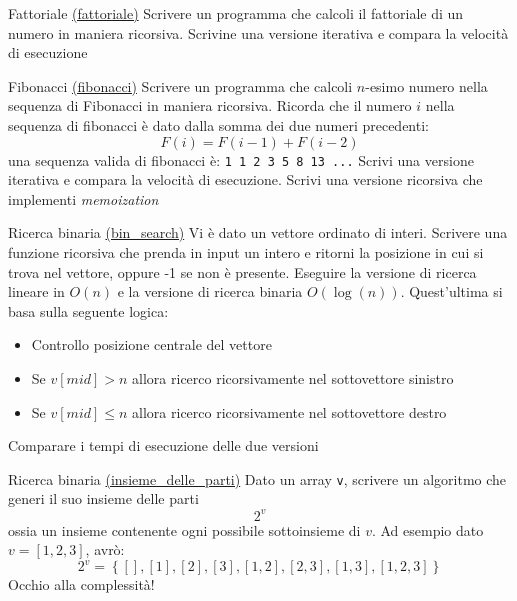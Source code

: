 \begin{esercizio}{Fattoriale \href{run:./files/algoritmi/fattoriale/}{(fattoriale)}}
	Scrivere un programma che calcoli il fattoriale di un numero in maniera ricorsiva. Scrivine una versione iterativa e compara la velocità di esecuzione
\end{esercizio}

\begin{esercizio}{Fibonacci \href{run:./files/algoritmi/fibonacci/}{(fibonacci)}}
	Scrivere un programma che calcoli $ n $-esimo numero nella sequenza di Fibonacci in maniera ricorsiva. Ricorda che il numero $ i $ nella sequenza di fibonacci è dato dalla somma dei due numeri precedenti:
	\[
		F(i) = F(i-1) + F(i-2)
	\]
	una sequenza valida di fibonacci è: \verb|1 1 2 3 5 8 13 ...|
	\vskip3mm
	Scrivi una versione iterativa e compara la velocità di esecuzione. Scrivi una versione ricorsiva che implementi \textit{memoization}
\end{esercizio}

\begin{esercizio}{Ricerca binaria \href{run:./files/algoritmi/bin_search/}{(bin\_search)}}
	Vi è dato un vettore ordinato di interi. Scrivere una funzione ricorsiva che prenda in input un intero e ritorni la posizione in cui si trova nel vettore, oppure -1 se non è presente.
	Eseguire la versione di ricerca lineare in $ O\left(n\right) $ e la versione di ricerca binaria $ O\left(\log \left(n\right)\right) $. Quest'ultima si basa sulla seguente logica:
	\begin{itemize}
		\item Controllo posizione centrale del vettore
		\item Se $ v\left[mid\right] > n $ allora ricerco ricorsivamente nel sottovettore sinistro
		\item Se $ v\left[mid\right] \le n $ allora ricerco ricorsivamente nel sottovettore destro
	\end{itemize}
	Comparare i tempi di esecuzione delle due versioni
\end{esercizio}

\begin{esercizio}{Ricerca binaria \href{run:./files/algoritmi/insieme_delle_parti/}{(insieme\_delle\_parti)}}
	Dato un array \verb|v|, scrivere un algoritmo che generi il suo insieme delle parti
	\[
		2^{v}
	\]
	ossia un insieme contenente ogni possibile sottoinsieme di $ v $. Ad esempio dato $v=[1,2,3]$, avrò:
	\[
		2^{v} = \left\{\left[\right], \left[1\right], \left[2\right], \left[3\right], \left[1,2\right], \left[2,3\right],\left[1,3\right], \left[1,2,3\right]\right\}
	\]
	Occhio alla complessità!
\end{esercizio}

